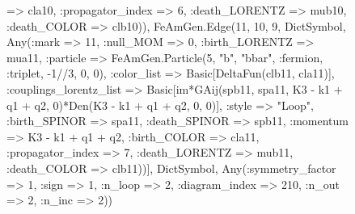 \documentclass{revtex4}
\begin{document}
\begin{figure}[!htb]
\begin{center}
{=> cla10, :propagator_index => 6, :death_LORENTZ => mub10, :death_COLOR => clb10)), FeAmGen.Edge(11, 10, 9, Dict{Symbol, Any}(:mark => 11, :null_MOM => 0, :birth_LORENTZ => mua11, :particle => FeAmGen.Particle(5, "b", "bbar", :fermion, :triplet, -1//3, 0, 0), :color_list => Basic[DeltaFun(clb11, cla11)], :couplings_lorentz_list => Basic[im*GAij(spb11, spa11, K3 - k1 + q1 + q2, 0)*Den(K3 - k1 + q1 + q2, 0, 0)], :style => "Loop", :birth_SPINOR => spa11, :death_SPINOR => spb11, :momentum => K3 - k1 + q1 + q2, :birth_COLOR => cla11, :propagator_index => 7, :death_LORENTZ => mub11, :death_COLOR => clb11))], Dict{Symbol, Any}(:symmetry_factor => 1, :sign => 1, :n_loop => 2, :diagram_index => 210, :n_out => 2, :n_inc => 2)) 
}
\end{center}
\end{figure}
\end{document}
